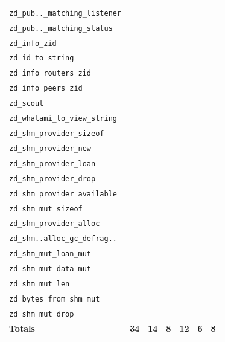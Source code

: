 \documentclass[11pt,a4paper]{article}
\newcommand{\fn}[1]{\texttt{#1}}
\newcommand{\yes}{\textbullet}
\newcommand{\no}{}
\begin{document}
{\begin{longtable}{l Y{7mm} Y{7mm} Y{7mm} Y{7mm} Y{7mm} Y{7mm}}
  \fn{zd\_pub..\_matching\_listener} & \yes & \no  & \no  & \no  & \yes & \no  \\
  \fn{zd\_pub..\_matching\_status}   & \no  & \no  & \no  & \no  & \no  & \no  \\
  \fn{zd\_info\_zid}                 & \yes & \no  & \no  & \no  & \no  & \no  \\
  \fn{zd\_id\_to\_string}            & \no  & \no  & \no  & \no  & \no  & \no  \\
  \fn{zd\_info\_routers\_zid}        & \no  & \no  & \no  & \no  & \yes & \no  \\
  \fn{zd\_info\_peers\_zid}          & \no  & \no  & \no  & \no  & \yes & \no  \\
  \fn{zd\_scout}                     & \yes & \no  & \yes & \no  & \yes & \no  \\
  \fn{zd\_whatami\_to\_view\_string} & \no  & \no  & \no  & \no  & \no  & \no  \\
  \fn{zd\_shm\_provider\_sizeof}     & \no  & \no  & \no  & \yes & \no  & \no  \\
  \fn{zd\_shm\_provider\_new}        & \yes & \no  & \no  & \no  & \no  & \no  \\
  \fn{zd\_shm\_provider\_loan}       & \no  & \yes & \no  & \no  & \no  & \yes \\
  \fn{zd\_shm\_provider\_drop}       & \yes & \no  & \no  & \no  & \no  & \no  \\
  \fn{zd\_shm\_provider\_available}  & \no  & \no  & \no  & \no  & \no  & \no  \\
  \fn{zd\_shm\_mut\_sizeof}          & \no  & \no  & \no  & \yes & \no  & \no  \\
  \fn{zd\_shm\_provider\_alloc}      & \yes & \no  & \no  & \no  & \no  & \no  \\
  \fn{zd\_shm..alloc\_gc\_defrag..}  & \yes & \no  & \no  & \no  & \no  & \no  \\
  \fn{zd\_shm\_mut\_loan\_mut}       & \no  & \yes & \no  & \no  & \no  & \yes \\
  \fn{zd\_shm\_mut\_data\_mut}       & \no  & \no  & \no  & \no  & \no  & \no  \\
  \fn{zd\_shm\_mut\_len}             & \no  & \no  & \no  & \no  & \no  & \no  \\
  \fn{zd\_bytes\_from\_shm\_mut}     & \yes & \no  & \no  & \no  & \no  & \no  \\
  \fn{zd\_shm\_mut\_drop}            & \yes & \no  & \no  & \no  & \no  & \no  \\
  \midrule
  \textbf{Totals}                    & \textbf{34} & \textbf{14} & \textbf{8} & \textbf{12} & \textbf{6} & \textbf{8} \\
\end{longtable}
}
\end{document}
